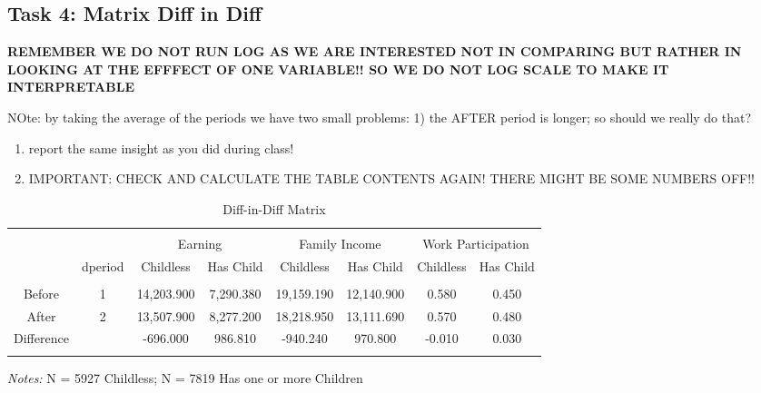 \documentclass[a4paper]{article}
\begin{document}
\subsection{Task 4: Matrix Diff in Diff}

\textbf{REMEMBER WE DO NOT RUN LOG AS WE ARE INTERESTED NOT IN COMPARING BUT RATHER IN LOOKING AT THE EFFFECT OF ONE VARIABLE!! SO WE DO NOT LOG SCALE TO MAKE IT INTERPRETABLE}

NOte: by taking the average of the periods we have two small problems: 1) the AFTER period is longer; so should we really do that?

\begin{enumerate}
   \item report the same insight as you did during class! 
   \item IMPORTANT: CHECK AND CALCULATE THE TABLE CONTENTS AGAIN! THERE MIGHT BE SOME NUMBERS OFF!!
\end{enumerate}

\begin{table}[!htbp] 
\begin{adjustwidth}{-0cm}{-0cm}
\begin{threeparttable}
\small
\captionsetup{font=small, justification=raggedright,singlelinecheck=false}
  \caption{Diff-in-Diff Matrix} 
  \label{} 
\begin{tabular}{@{\extracolsep{8pt}}lccccccc} 
\\[-5.8ex]\hline 
\hline \\[-1.8ex]
\multicolumn{2}{c}{}  & \multicolumn{2}{c}{Earning}  & \multicolumn{2}{c}{Family Income} & \multicolumn{2}{c}{Work Participation} \\ 
\multicolumn{1}{c}{} & \multicolumn{1}{c}{dperiod} & \multicolumn{1}{c}{Childless} & \multicolumn{1}{c}{Has Child} & \multicolumn{1}{c}{Childless} & \multicolumn{1}{c}{Has Child} & \multicolumn{1}{c}{Childless} & \multicolumn{1}{c}{Has Child} \\ 
\hline \\[-1.8ex] 
\multicolumn{1}{c}{Before} & 1 & 14,203.900 & 7,290.380 & 19,159.190 & 12,140.900 & 0.580 & 0.450 \\ 
\multicolumn{1}{c}{After} & 2 & 13,507.900 & 8,277.200 & 18,218.950 & 13,111.690 & 0.570 & 0.480 \\ 
\multicolumn{1}{c}{Difference} &  & -696.000 & 986.810 & -940.240 & 970.800 & -0.010 & 0.030 \\ 
\hline \\[-3.6ex] 
\end{tabular} 
\begin{tablenotes}
      \small
      \item\textit{Notes:} N = 5927 Childless; N = 7819 Has one or more Children
    \end{tablenotes}
\end{threeparttable}
\end{adjustwidth}
\end{table}
\end{document}
